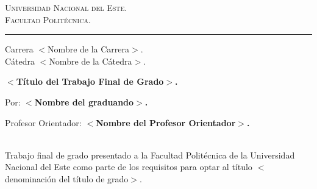 \vspace*{-3cm}
\begin{figure}[h]
\leavevmode
\begin{minipage}{\textwidth}
\begin{center}
\end{center}
\end{minipage}
\end{figure}

\thispagestyle{empty}

{\bf
\begin{center}
\large
\vspace*{-1 cm}\Large \textsc{Universidad Nacional del Este.} \\
\Large \textsc{Facultad Politécnica.} \\
\vspace*{0.5 cm}\hrule
\vspace*{0.5 cm}\Large Carrera $<$Nombre de la Carrera$>$.\\
\vspace*{0 cm}\Large Cátedra $<$Nombre de la Cátedra$>$.\\
\end{center}
}

\vspace{3.5 cm}
{
\noindent
\begin{center}
\huge \bf $<$Título del Trabajo Final de Grado$>$.
\end{center}
}


\vspace{0.5 cm}
{ 

Por: \textbf{\Large $<$Nombre del graduando$>$.}

\vspace*{.5 cm}
Profesor Orientador: \textbf{\large $<$Nombre del Profesor Orientador$>$.}
}%
\vspace*{0.5 cm}\\
Trabajo final de grado presentado a la Facultad Politécnica de la Universidad Nacional del Este como parte de los requisitos para optar al título $<$denominación del título de grado$>$.

